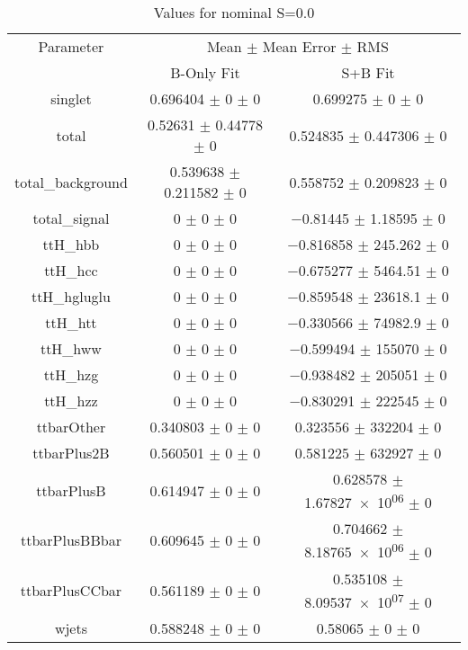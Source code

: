 \begin{table}
\centering
\caption{Values for nominal S=0.0}
\begin{tabular}{ccc}
\toprule
Parameter & \multicolumn{2}{c}{Mean $\pm$ Mean Error $\pm$ RMS}\\
 & B-Only Fit & S+B Fit\\
\midrule
singlet & \num{0.696404} $\pm$ \num{0} $\pm$ \num{0} & \num{0.699275} $\pm$ \num{0} $\pm$ \num{0}\\
total & \num{0.52631} $\pm$ \num{0.44778} $\pm$ \num{0} & \num{0.524835} $\pm$ \num{0.447306} $\pm$ \num{0}\\
total\_background & \num{0.539638} $\pm$ \num{0.211582} $\pm$ \num{0} & \num{0.558752} $\pm$ \num{0.209823} $\pm$ \num{0}\\
total\_signal & \num{0} $\pm$ \num{0} $\pm$ \num{0} & \num{-0.81445} $\pm$ \num{1.18595} $\pm$ \num{0}\\
ttH\_hbb & \num{0} $\pm$ \num{0} $\pm$ \num{0} & \num{-0.816858} $\pm$ \num{245.262} $\pm$ \num{0}\\
ttH\_hcc & \num{0} $\pm$ \num{0} $\pm$ \num{0} & \num{-0.675277} $\pm$ \num{5464.51} $\pm$ \num{0}\\
ttH\_hgluglu & \num{0} $\pm$ \num{0} $\pm$ \num{0} & \num{-0.859548} $\pm$ \num{23618.1} $\pm$ \num{0}\\
ttH\_htt & \num{0} $\pm$ \num{0} $\pm$ \num{0} & \num{-0.330566} $\pm$ \num{74982.9} $\pm$ \num{0}\\
ttH\_hww & \num{0} $\pm$ \num{0} $\pm$ \num{0} & \num{-0.599494} $\pm$ \num{155070} $\pm$ \num{0}\\
ttH\_hzg & \num{0} $\pm$ \num{0} $\pm$ \num{0} & \num{-0.938482} $\pm$ \num{205051} $\pm$ \num{0}\\
ttH\_hzz & \num{0} $\pm$ \num{0} $\pm$ \num{0} & \num{-0.830291} $\pm$ \num{222545} $\pm$ \num{0}\\
ttbarOther & \num{0.340803} $\pm$ \num{0} $\pm$ \num{0} & \num{0.323556} $\pm$ \num{332204} $\pm$ \num{0}\\
ttbarPlus2B & \num{0.560501} $\pm$ \num{0} $\pm$ \num{0} & \num{0.581225} $\pm$ \num{632927} $\pm$ \num{0}\\
ttbarPlusB & \num{0.614947} $\pm$ \num{0} $\pm$ \num{0} & \num{0.628578} $\pm$ \num{1.67827e+06} $\pm$ \num{0}\\
ttbarPlusBBbar & \num{0.609645} $\pm$ \num{0} $\pm$ \num{0} & \num{0.704662} $\pm$ \num{8.18765e+06} $\pm$ \num{0}\\
ttbarPlusCCbar & \num{0.561189} $\pm$ \num{0} $\pm$ \num{0} & \num{0.535108} $\pm$ \num{8.09537e+07} $\pm$ \num{0}\\
wjets & \num{0.588248} $\pm$ \num{0} $\pm$ \num{0} & \num{0.58065} $\pm$ \num{0} $\pm$ \num{0}\\
\bottomrule
\end{tabular}
\end{table}